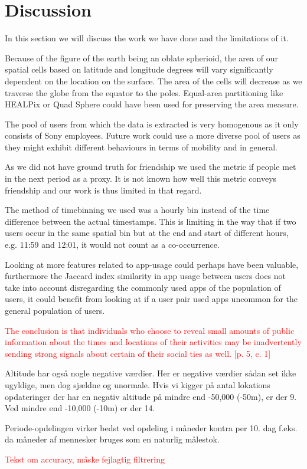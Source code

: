 \chapter{Discussion}
\label{chap:discussion}
In this section we will discuss the work we have done and the limitations of it.

Because of the figure of the earth being an oblate spherioid, the area of our spatial cells based on latitude and longitude degrees will vary significantly dependent on the location on the surface. The area of the cells will decrease as we traverse the globe from the equator to the poles. Equal-area partitioning like HEALPix or Quad Sphere could have been used for preserving the area measure.

The pool of users from which the data is extracted is very homogenous as it only consists of Sony employees. Future work could use a more diverse pool of users as they might exhibit different behaviours in terms of mobility and in general.

As we did not have ground truth for friendship we used the metric if people met in the next period as a proxy. It is not known how well this metric conveys friendship and our work is thus limited in that regard.

The method of timebinning we used was a hourly bin instead of the time difference between the actual timestamps. This is limiting in the way that if two users occur in the same spatial bin but at the end and start of different hours, e.g. 11:59 and 12:01, it would not count as a co-occurrence.

Looking at more features related to app-usage could perhaps have been valuable, furthermore the Jaccard index similarity in app usage between users does not take into account disregarding the commonly used apps of the population of users, it could benefit from looking at if a user pair used apps uncommon for the general population of users.


\textcolor{red}{The conclusion is that individuals who choose to reveal small amounts of public information about the times and locations of their activities may be inadvertently sending strong signals about certain of their social ties as well. [p. 5, c. 1]}


Altitude har også nogle negative værdier. Her er negative værdier sådan set ikke ugyldige, men dog sjældne og unormale. Hvis vi kigger på antal lokations opdateringer der har en negativ altitude på mindre end -50,000 (-50m), er der 9. Ved mindre end -10,000 (-10m) er der 14.

Periode-opdelingen virker bedst ved opdeling i måneder kontra per 10. dag f.eks. da måneder af mennesker bruges som en naturlig målestok.

\textcolor{red}{Tekst om accuracy, måske fejlagtig filtrering}